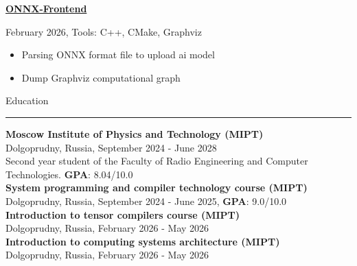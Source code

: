 \documentclass[letterpaper, 12pt]{letter}
\begin{document}
\begin{minipage}[t]{0.6\textwidth}
{\large \textbf{\href{https://github.com/rogovogor17/ONNX-Frontend}{ONNX-Frontend}}}

{\small February 2026, Tools: C++, CMake, Graphviz}

\begin{itemize}
    \item \small{Parsing ONNX format file to upload ai model}
    \item Dump Graphviz computational graph
\end{itemize}

{\large Education}
\vspace{0.4cm}
\rule{\linewidth}{0.4pt}

{\textbf{Moscow Institute of Physics and Technology (MIPT)}}\\
\small Dolgoprudny, Russia, September 2024 - June 2028\\

\small Second year student of the Faculty of Radio Engineering and Computer Technologies. \textbf{GPA}: 8.04/10.0\\

\textbf{System programming and compiler technology course (MIPT)}\\
\small Dolgoprudny, Russia, September 2024 - June 2025, \textbf{GPA}: 9.0/10.0\\

{\textbf{Introduction to tensor compilers course (MIPT)}}\\
\small Dolgoprudny, Russia, February 2026 - May 2026\\

{\textbf{Introduction to computing systems architecture (MIPT)}}\\
\small Dolgoprudny, Russia, February 2026 - May 2026\\

\end{minipage}
\end{document}
